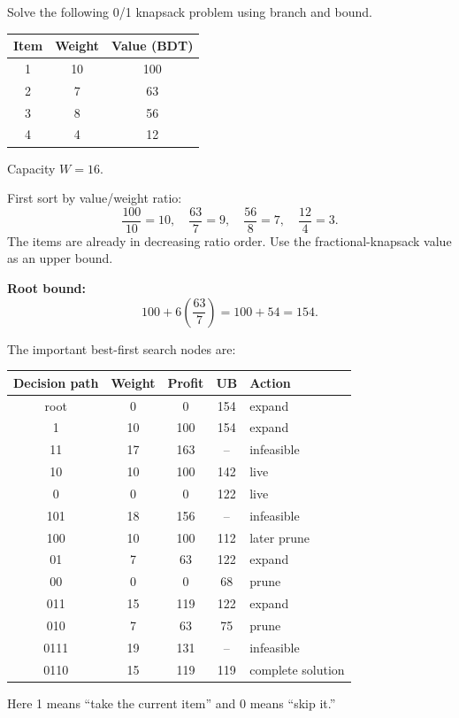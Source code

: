 \documentclass[11pt,a4paper]{article}
\begin{document}
\begin{qaquestion}
Solve the following 0/1 knapsack problem using branch and bound.

\begin{center}
\begin{tabular}{c c c}
\toprule
Item & Weight & Value (BDT)\\
\midrule
1&10&100\\
2&7&63\\
3&8&56\\
4&4&12\\
\bottomrule
\end{tabular}
\qquad Capacity \(W=16\).
\end{center}
\end{qaquestion}
\begin{qaanswer}[Answer 3(c)]
First sort by value/weight ratio:
\[
\frac{100}{10}=10,\quad \frac{63}{7}=9,\quad \frac{56}{8}=7,\quad \frac{12}{4}=3.
\]
The items are already in decreasing ratio order. Use the fractional-knapsack value as an upper bound.

\textbf{Root bound:}
\[
100+6\left(\frac{63}{7}\right)=100+54=154.
\]

The important best-first search nodes are:
\begin{center}
\small
\begin{tabular}{c c c c l}
\toprule
Decision path & Weight & Profit & UB & Action\\
\midrule
root &0&0&154&expand\\
1 &10&100&154&expand\\
11 &17&163&--&infeasible\\
10 &10&100&142&live\\
0 &0&0&122&live\\
101 &18&156&--&infeasible\\
100 &10&100&112&later prune\\
01 &7&63&122&expand\\
00 &0&0&68&prune\\
011 &15&119&122&expand\\
010 &7&63&75&prune\\
0111 &19&131&--&infeasible\\
0110 &15&119&119&complete solution\\
\bottomrule
\end{tabular}
\end{center}
Here 1 means ``take the current item'' and 0 means ``skip it.''


\end{qaanswer}
\end{document}
